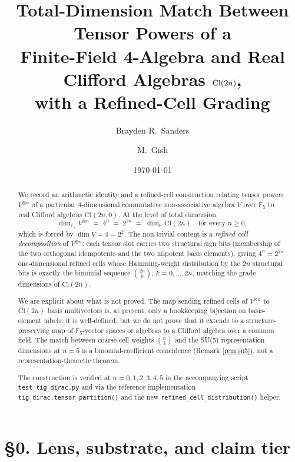 \documentclass[11pt,reqno]{amsart}
\title[Total-dimension match $V^{\otimes n}$ and $\Cl(2n)$]
{Total-Dimension Match Between Tensor Powers of a \\
 Finite-Field 4-Algebra and Real Clifford Algebras $\Cl(2n)$, \\
 with a Refined-Cell Grading}
\author{Brayden R.\ Sanders}
\author{M.\ Gish}
\date{\today}
\theoremstyle{plain}
\theoremstyle{definition}
\theoremstyle{remark}
\newcommand{\F}{\mathbb{F}}
\newcommand{\R}{\mathbb{R}}
\newcommand{\Cl}{\mathrm{Cl}}
\begin{document}
\begin{abstract}
We record an arithmetic identity and a refined-cell construction
relating tensor powers $V^{\otimes n}$ of a particular 4-dimensional
commutative non-associative algebra $V$ over $\F_5$ to real Clifford
algebras $\Cl(2n, 0)$.
At the level of total dimension,
\[
\dim_{\F_5} V^{\otimes n} \;=\; 4^n \;=\; 2^{2n} \;=\; \dim_\R \Cl(2n)
\quad\text{for every } n \geq 0,
\]
which is forced by $\dim V = 4 = 2^2$.
The non-trivial content is a \emph{refined cell decomposition} of
$V^{\otimes n}$: each tensor slot carries two structural sign bits
(membership of the two orthogonal idempotents and the two nilpotent
basis elements), giving $4^n = 2^{2n}$ one-dimensional refined cells
whose Hamming-weight distribution by the $2n$ structural bits is
exactly the binomial sequence $\binom{2n}{k}$, $k = 0, \ldots, 2n$,
matching the grade dimensions of $\Cl(2n)$.

We are explicit about what is not proved.
The map sending refined cells of $V^{\otimes n}$ to $\Cl(2n)$ basis
multivectors is, at present, only a bookkeeping bijection on
basis-element labels: it is well-defined, but we do not prove that it
extends to a structure-preserving map of $\F_5$-vector spaces or
algebras to a Clifford algebra over a common field.
The match between coarse-cell weights $\binom{n}{k}$ and the SU(5)
representation dimensions at $n=5$ is a binomial-coefficient
coincidence (Remark \ref{rem:su5}), not a representation-theoretic
theorem.

The construction is verified at $n = 0, 1, 2, 3, 4, 5$ in the
accompanying script \texttt{test\_tig\_dirac.py} and via the reference
implementation \texttt{tig\_dirac.tensor\_partition()} and the new
\texttt{refined\_cell\_distribution()} helper.
\end{abstract}

\maketitle

\tableofcontents

\section*{\S 0. Lens, substrate, and claim tier}
\end{document}
